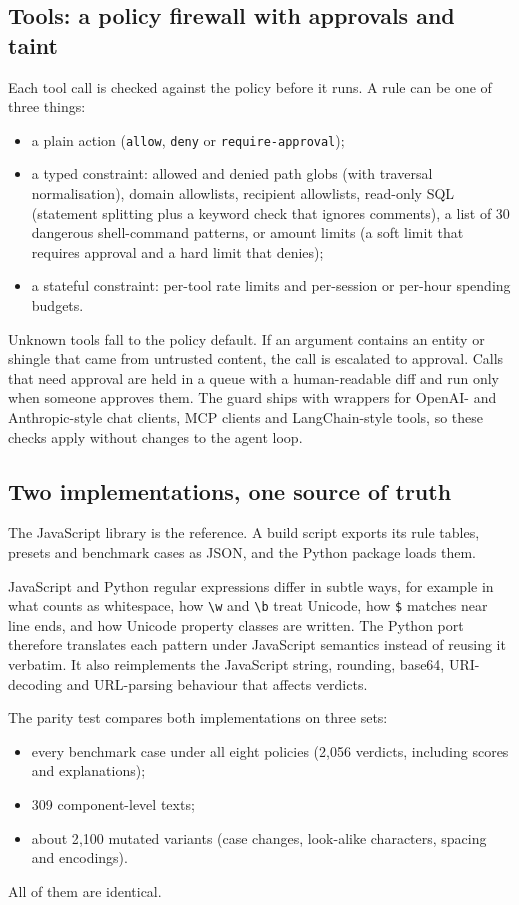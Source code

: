 \documentclass[10pt]{article}
\begin{document}
\subsection{Tools: a policy firewall with approvals and taint}
Each tool call is checked against the policy before it runs. A rule can be one of three things:
\begin{itemize}
\item a plain action (\texttt{allow}, \texttt{deny} or \texttt{require-approval});
\item a typed constraint: allowed and denied path globs (with traversal normalisation), domain allowlists, recipient allowlists, read-only SQL (statement splitting plus a keyword check that ignores comments), a list of 30 dangerous shell-command patterns, or amount limits (a soft limit that requires approval and a hard limit that denies);
\item a stateful constraint: per-tool rate limits and per-session or per-hour spending budgets.
\end{itemize}
Unknown tools fall to the policy default. If an argument contains an entity or shingle that came from untrusted content, the call is escalated to approval. Calls that need approval are held in a queue with a human-readable diff and run only when someone approves them. The guard ships with wrappers for OpenAI- and Anthropic-style chat clients, MCP clients and LangChain-style tools, so these checks apply without changes to the agent loop.

\subsection{Two implementations, one source of truth}
The JavaScript library is the reference. A build script exports its rule tables, presets and benchmark cases as JSON, and the Python package loads them.

JavaScript and Python regular expressions differ in subtle ways, for example in what counts as whitespace, how \verb|\w| and \verb|\b| treat Unicode, how \texttt{\$} matches near line ends, and how Unicode property classes are written. The Python port therefore translates each pattern under JavaScript semantics instead of reusing it verbatim. It also reimplements the JavaScript string, rounding, base64, URI-decoding and URL-parsing behaviour that affects verdicts.

The parity test compares both implementations on three sets:
\begin{itemize}
\item every benchmark case under all eight policies (2{,}056 verdicts, including scores and explanations);
\item 309 component-level texts;
\item about 2{,}100 mutated variants (case changes, look-alike characters, spacing and encodings).
\end{itemize}
All of them are identical.
\end{document}
